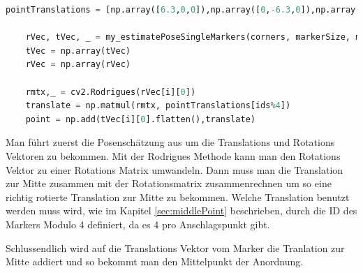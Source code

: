 \begin{lstlisting}[language=Python, caption=ID und Ecken eines ArUco Markers erkennen]
    pointTranslations = [np.array([6.3,0,0]),np.array([0,-6.3,0]),np.array([-6.3,0,0]),np.array([0,6.3,0])]

    rVec, tVec, _ = my_estimatePoseSingleMarkers(corners, markerSize, mtx, dist)
    tVec = np.array(tVec)
    rVec = np.array(rVec)

    rmtx,_ = cv2.Rodrigues(rVec[i][0])
    translate = np.matmul(rmtx, pointTranslations[ids%4])
    point = np.add(tVec[i][0].flatten(),translate)
\end{lstlisting}

Man führt zuerst die Posenschätzung aus um die Translations und Rotations Vektoren zu bekommen.
Mit der Rodrigues Methode kann man den Rotations Vektor zu einer Rotations Matrix umwandeln.
Dann muss man die Translation zur Mitte zusammen mit der Rotationsmatrix zusammenrechnen um so eine richtig rotierte Translation zur Mitte zu bekommen.
Welche Translation benutzt werden muss wird, wie im Kapitel \ref{sec:middlePoint} beschrieben, durch die ID des Markers Modulo 4 definiert, da es 4 pro Anschlagspunkt gibt.

Schlussendlich wird auf die Translations Vektor vom Marker die Tranlation zur Mitte addiert und so bekommt man den Mittelpunkt der Anordnung.




